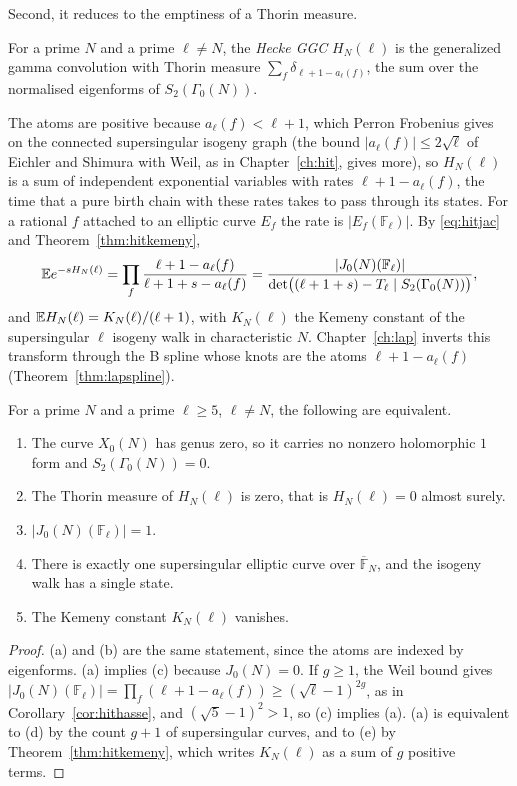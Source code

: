 Second, it reduces to the emptiness of a Thorin measure.

\begin{definition}\label{def:flthecke}
For a prime $N$ and a prime $\ell\ne N$, the \emph{Hecke GGC} $H_N(\ell)$ is the generalized gamma convolution with Thorin measure $\sum_f\delta_{\ell+1-a_\ell(f)}$, the sum over the normalised eigenforms of $S_2(\Gamma_0(N))$.
\end{definition}

The atoms are positive because $a_\ell(f)<\ell+1$, which Perron Frobenius gives on the connected supersingular isogeny graph (the bound $|a_\ell(f)|\le2\sqrt\ell$ of Eichler and Shimura with Weil, as in Chapter~\ref{ch:hit}, gives more), so $H_N(\ell)$ is a sum of independent exponential variables with rates $\ell+1-a_\ell(f)$, the time that a pure birth chain with these rates takes to pass through its states. For a rational $f$ attached to an elliptic curve $E_f$ the rate is $|E_f(\mathbb F_\ell)|$. By \eqref{eq:hitjac} and Theorem~\ref{thm:hitkemeny},
\[
\mathbb{E} e^{-sH_N(\ell)}=\prod_f\frac{\ell+1-a_\ell(f)}{\ell+1+s-a_\ell(f)}=\frac{|J_0(N)(\mathbb F_\ell)|}{\det\bigl((\ell+1+s)-T_\ell\mid S_2(\Gamma_0(N))\bigr)},
\]
and $\mathbb{E} H_N(\ell)=K_N(\ell)/(\ell+1)$, with $K_N(\ell)$ the Kemeny constant of the supersingular $\ell$ isogeny walk in characteristic $N$. Chapter~\ref{ch:lap} inverts this transform through the B spline whose knots are the atoms $\ell+1-a_\ell(f)$ (Theorem~\ref{thm:lapspline}).

\begin{theorem}\label{thm:fltempty}
For a prime $N$ and a prime $\ell\ge5$, $\ell\ne N$, the following are equivalent.
\begin{enumerate}
\item[(a)] The curve $X_0(N)$ has genus zero, so it carries no nonzero holomorphic $1$ form and $S_2(\Gamma_0(N))=0$.
\item[(b)] The Thorin measure of $H_N(\ell)$ is zero, that is $H_N(\ell)=0$ almost surely.
\item[(c)] $|J_0(N)(\mathbb F_\ell)|=1$.
\item[(d)] There is exactly one supersingular elliptic curve over $\overline{\mathbb F}_N$, and the isogeny walk has a single state.
\item[(e)] The Kemeny constant $K_N(\ell)$ vanishes.
\end{enumerate}
\end{theorem}

\begin{proof}
(a) and (b) are the same statement, since the atoms are indexed by eigenforms. (a) implies (c) because $J_0(N)=0$. If $g\ge1$, the Weil bound gives $|J_0(N)(\mathbb F_\ell)|=\prod_f(\ell+1-a_\ell(f))\ge(\sqrt\ell-1)^{2g}$, as in Corollary~\ref{cor:hithasse}, and $(\sqrt5-1)^2>1$, so (c) implies (a). (a) is equivalent to (d) by the count $g+1$ of supersingular curves, and to (e) by Theorem~\ref{thm:hitkemeny}, which writes $K_N(\ell)$ as a sum of $g$ positive terms.
\end{proof}


